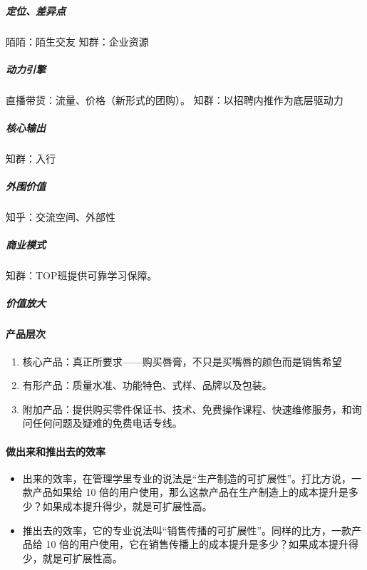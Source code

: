 \documentclass[letterpaper,10pt,english]{sphinxmanual}
\begin{document}
\subparagraph{定位、差异点}
\label{\detokenize{chapter_introduction/Product:id16}}
陌陌：陌生交友 知群：企业资源


\subparagraph{动力引擎}
\label{\detokenize{chapter_introduction/Product:id17}}
直播带货：流量、价格（新形式的团购）。 知群：以招聘内推作为底层驱动力


\subparagraph{核心输出}
\label{\detokenize{chapter_introduction/Product:id18}}
知群：入行


\subparagraph{外围价值}
\label{\detokenize{chapter_introduction/Product:id19}}
知乎：交流空间、外部性


\subparagraph{商业模式}
\label{\detokenize{chapter_introduction/Product:id20}}
知群：TOP班提供可靠学习保障。


\subparagraph{价值放大}
\label{\detokenize{chapter_introduction/Product:id21}}

\paragraph{产品层次}
\label{\detokenize{chapter_introduction/Product:id22}}\begin{enumerate}
%
\item {} 
核心产品：真正所要求——购买唇膏，不只是买嘴唇的颜色而是销售希望

\item {} 
有形产品：质量水准、功能特色、式样、品牌以及包装。

\item {} 
附加产品：提供购买零件保证书、技术、免费操作课程、快速维修服务，和询问任何问题及疑难的免费电话专线。

\end{enumerate}


\paragraph{做出来和推出去的效率}
\label{\detokenize{chapter_introduction/Product:id23}}\begin{itemize}
\item {} 
出来的效率，在管理学里专业的说法是“生产制造的可扩展性”。打比方说，一款产品如果给
10
倍的用户使用，那么这款产品在生产制造上的成本提升是多少？如果成本提升得少，就是可扩展性高。

\item {} 
推出去的效率，它的专业说法叫“销售传播的可扩展性”。同样的比方，一款产品给
10
倍的用户使用，它在销售传播上的成本提升是多少？如果成本提升得少，就是可扩展性高。

\end{itemize}
\end{document}
